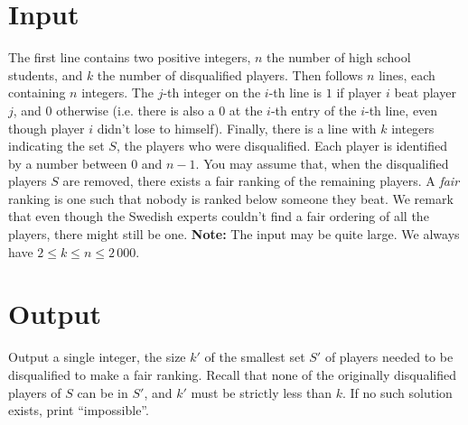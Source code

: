 \section*{Input}
The first line contains two positive integers, $n$ the number of high school students, and $k$ the number of disqualified players. Then follows $n$ lines, each containing $n$ integers. The $j$-th integer on the $i$-th line is $1$ if player $i$ beat player $j$, and $0$ otherwise (i.e. there is also a $0$ at the $i$-th entry of the $i$-th line, even though player $i$ didn't lose to himself). Finally, there is a line with $k$ integers indicating the set $S$, the players who were disqualified. Each player is identified by a number between $0$ and $n-1$. You may assume that, when the disqualified players $S$ are removed, there exists a fair ranking of the remaining players. A \emph{fair} ranking is one such that nobody is ranked below someone they beat. We remark that even though the Swedish experts couldn't find a fair ordering of all the players, there might still be one. \textbf{Note:} The input may be quite large.
%
We always have $2 \leq k \leq n \leq 2\,000$. 
%

\section*{Output}
Output a single integer, the size $k'$ of the smallest set $S'$ of players needed to be disqualified to make a fair ranking. Recall that none of the originally disqualified players of $S$ can be in $S'$, and $k'$ must be strictly less than $k$. If no such solution exists, print ``impossible''.


